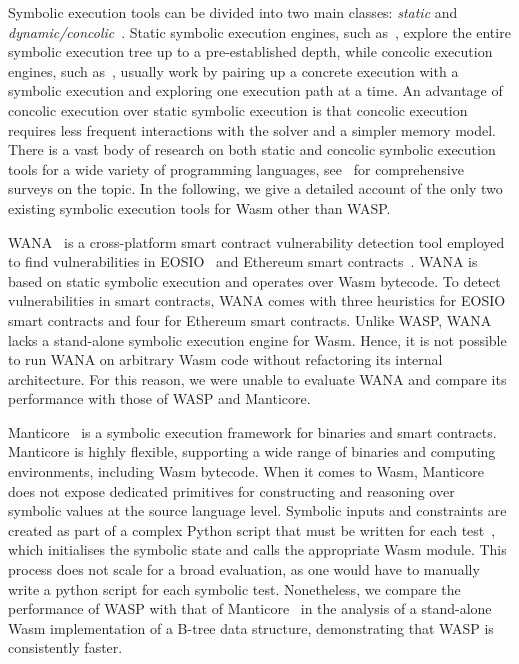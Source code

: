 Symbolic execution tools can be divided into two main classes: \emph{static} and \emph{dynamic/concolic}~\cite{survey}. Static symbolic execution engines, such as~\cite{effigy,Pasareanu:2010,generalized-sym-exec,rosette,cosette,javert2.0}, explore the entire symbolic execution tree up to a pre-established depth, while concolic execution engines, such as~\cite{Cadar:2008,Godefroid:2005,Sen:2005,mayhem,sym-exec-framework-for-javascript,symjs,multi-se}, usually work by pairing up a concrete execution with a symbolic execution and exploring one execution path at a time. An advantage of concolic execution over static symbolic execution is that concolic execution requires less frequent interactions with the solver and a simpler memory model. There is a vast body of research on both static and concolic symbolic execution tools for a wide variety of programming languages, see~\cite{survey,survey1,sym-exec-3-decades-later} for comprehensive surveys on the topic. In the following, we give a detailed account of the only two existing symbolic execution tools for Wasm other than WASP. 

WANA~\cite{Wang:2020} is a cross-platform smart contract vulnerability detection tool employed to find vulnerabilities in EOSIO~\cite{Larimer:2018} and Ethereum smart contracts~\cite{Kashyap:2021}. WANA is based on static symbolic execution and operates over Wasm bytecode. To detect vulnerabilities in smart contracts, WANA comes with three heuristics for EOSIO smart contracts and four for Ethereum smart contracts.
 Unlike WASP, WANA lacks a stand-alone symbolic execution engine for Wasm. Hence, it is not possible to run WANA on arbitrary Wasm code without refactoring its internal architecture. For this reason, we were unable to evaluate WANA and compare its performance with those of WASP and Manticore.  

Manticore~\cite{Mossberg:2019} is a symbolic execution framework for binaries and smart contracts. Manticore is highly flexible, supporting a wide range of binaries and computing environments, including Wasm bytecode. %
When it comes to Wasm, Manticore does not expose dedicated primitives for constructing and reasoning over symbolic values at the source language level. Symbolic inputs and constraints are created as part of a complex Python script that must be written for each test~\cite{Hennenfent:2020}, which initialises the symbolic state and calls the appropriate Wasm module. This process does not scale for a broad evaluation, as one would have to manually write a python script for each symbolic test. Nonetheless, we compare the performance of WASP with that of Manticore~\cite{Mossberg:2019} in the analysis of a stand-alone Wasm implementation of a B-tree data structure, demonstrating that WASP is consistently faster.

